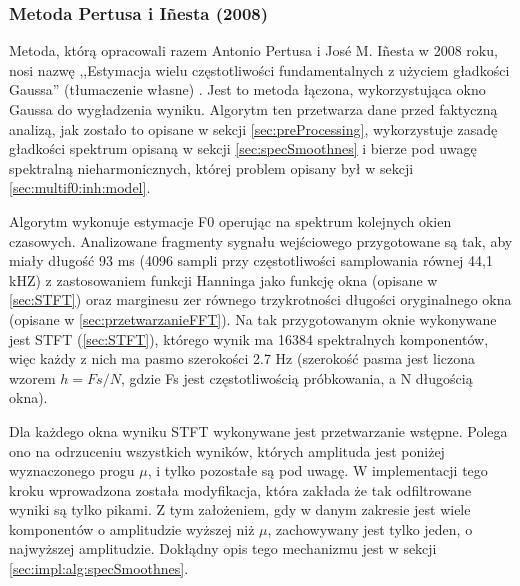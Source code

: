 \documentclass[12pt,a4paper,twoside]{mwart}
\begin{document}
\subsubsection{Metoda Pertusa i Iñesta (2008)} \label{sec:pertus1}
Metoda, którą opracowali razem Antonio Pertusa i José M. Iñesta w 2008 roku, nosi nazwę ,,Estymacja wielu częstotliwości fundamentalnych z użyciem gładkości Gaussa'' (tłumaczenie własne) \cite{Transcription:Pertus:Inharmonicity}. Jest to metoda łączona, wykorzystująca okno Gaussa do wygładzenia wyniku. Algorytm ten przetwarza dane przed faktyczną analizą, jak zostało to opisane w sekcji \ref{sec:preProcessing}, wykorzystuje zasadę gładkości spektrum opisaną w sekcji \ref{sec:specSmoothnes} i bierze pod uwagę spektralną nieharmonicznych, której problem opisany był w sekcji \ref{sec:multif0:inh:model}.

Algorytm wykonuje estymacje F0 operując na spektrum kolejnych okien czasowych. Analizowane fragmenty sygnału wejściowego przygotowane są tak, aby miały długość 93 ms (4096 sampli przy częstotliwości samplowania równej 44,1 kHZ) z zastosowaniem funkcji Hanninga jako funkcję okna (opisane w \ref{sec:STFT}) oraz marginesu zer równego trzykrotności długości oryginalnego okna (opisane w \ref{sec:przetwarzanieFFT}). Na tak przygotowanym oknie wykonywane jest STFT (\ref{sec:STFT}), którego wynik ma 16384 spektralnych komponentów, więc każdy z nich ma pasmo szerokości 2.7 Hz (szerokość pasma jest liczona wzorem $h = Fs / N$, gdzie Fs jest częstotliwością próbkowania, a N długością okna).

Dla każdego okna wyniku STFT wykonywane jest przetwarzanie wstępne. Polega ono na odrzuceniu wszystkich wyników, których amplituda jest poniżej wyznaczonego progu $\mu$, i tylko pozostałe są pod uwagę. W implementacji tego kroku wprowadzona została modyfikacja, która zakłada że tak odfiltrowane wyniki są tylko pikami. Z tym założeniem, gdy w danym zakresie jest wiele komponentów o amplitudzie wyższej niż $\mu$, zachowywany jest tylko jeden, o najwyższej amplitudzie. Dokłądny opis tego mechanizmu jest w sekcji \ref{sec:impl:alg:specSmoothnes}.
\end{document}
